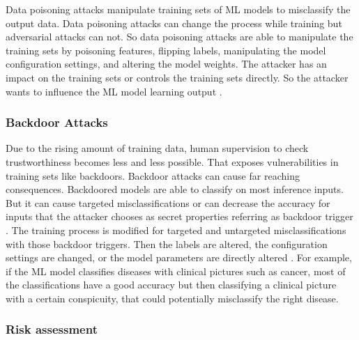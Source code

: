 Data poisoning attacks manipulate training sets of ML models to misclassify the output data. Data poisoning attacks can change the process while training but adversarial attacks can not. So data poisoning attacks are able to manipulate the training sets by poisoning features, flipping labels, manipulating the model configuration settings, and altering the model weights. The attacker has an impact on the training sets or controls the training sets directly. So the attacker wants to influence the ML model learning output \cite{DBLP:journals/corr/abs-2112-02797}.

\subsubsection*{Backdoor Attacks}
\label{sec:backdoor}

Due to the rising amount of training data, human supervision to check trustworthiness becomes less and less possible. That exposes vulnerabilities in training sets like backdoors. Backdoor attacks
can cause far reaching consequences. Backdoored models are able to classify on most inference inputs. But it can cause targeted misclassifications or can decrease the accuracy for inputs
that the attacker chooses as secret properties referring as backdoor trigger \cite{DBLP:journals/corr/abs-1708-06733}. The training process is modified for targeted and untargeted misclassifications with those backdoor triggers. Then the labels are altered, the configuration settings are changed, or the model parameters are directly altered \cite{DBLP:journals/corr/abs-2112-02797}. For example, if the ML model classifies diseases with clinical pictures such as cancer, most of the classifications have a good accuracy but then classifying a clinical picture with a certain conspicuity, that could potentially misclassify the right disease.

\subsubsection*{Risk assessment}

